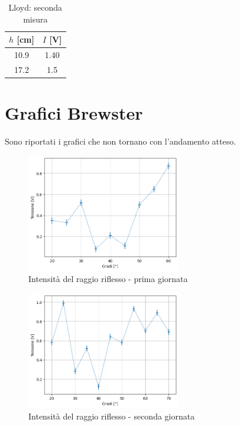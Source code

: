 \documentclass[letterpaper,12pt]{article}
\begin{document}
\begin{table}[h!]
	\centering
	\caption{Lloyd: seconda misura}
	\label{tab:lloyd2}
	\begin{tabular}{|c|c|}
		\hline
		$h$ [cm] & $I$ [V] \\
		\hline
		10.9     & 1.40    \\
		17.2     & 1.5     \\
		\hline
	\end{tabular}
\end{table}

\newpage
\section{Grafici Brewster}
Sono riportati i grafici che non tornano con l'andamento atteso.

\begin{figure}[h!]
	\centering
	\includegraphics[width = 0.6\textwidth]{riflesso1.png}
	\caption{Intensità del raggio riflesso - prima giornata}
	\label{fig:riflesso1}
\end{figure}

\begin{figure}[h!]
	\centering
	\includegraphics[width = 0.6\textwidth]{riflesso2.png}
	\caption{Intensità del raggio riflesso - seconda giornata}
	\label{fig:riflesso2}
\end{figure}
\end{document}
